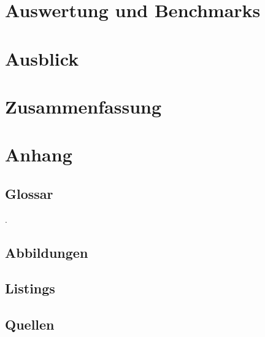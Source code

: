 \documentclass[12pt]{article}
\begin{document}
\newpage %

\section{Auswertung und Benchmarks}
\label{sec:auswertung}


\newpage %

\section{Ausblick}
\label{sec:ausblick}


\newpage %

\section{Zusammenfassung}
\label{sec:zusammenfassung}


\newpage %

\cfoot{}
\section*{Anhang}
\label{sec:anhang}

\subsection*{Glossar}
\label{subsec:glossar}
\begingroup
\renewcommand{\section}[2]{}
\printglossary[style=tree]
\endgroup
\newpage

{\small\color{white}.}
\vspace{-2cm}
\subsection*{Abbildungen}
\label{subsec:abbildungen}
\begingroup
\renewcommand{\section}[2]{}
\listoffigures
\endgroup

\subsection*{Listings}
\label{subsec:listings}
\begingroup
\renewcommand{\section}[2]{}
\lstlistoflistings
\endgroup

\subsection*{Quellen}
\label{subsec:quellen}
\begingroup
\renewcommand{\section}[2]{}


\endgroup
\end{document}
